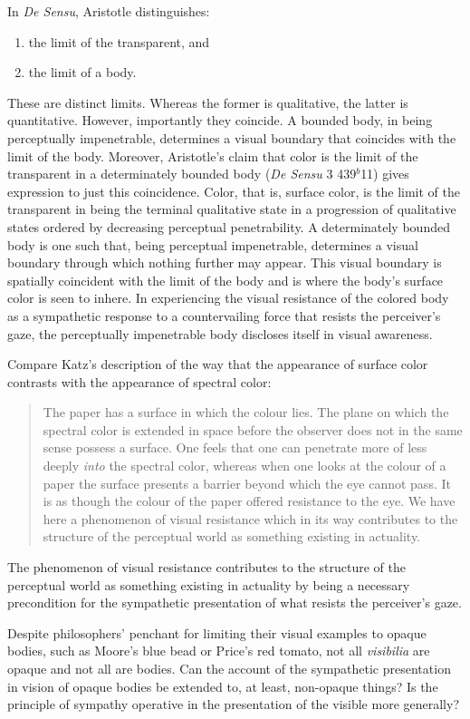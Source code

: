 In \emph{De Sensu}, Aristotle distinguishes:
\begin{enumerate}[(1)]
	\item the limit of the transparent, and
	\item the limit of a body.
\end{enumerate}
These are distinct limits. Whereas the former is qualitative, the latter is quantitative. However, importantly they coincide. A bounded body, in being perceptually impenetrable, determines a visual boundary that coincides with the limit of the body. Moreover, Aristotle’s claim that color is the limit of the transparent in a determinately bounded body (\emph{De Sensu} 3 439\( ^{b} \)11) gives expression to just this coincidence. Color, that is, surface color, is the limit of the transparent in being the terminal qualitative state in a progression of qualitative states ordered by decreasing perceptual penetrability. A determinately bounded body is one such that, being perceptual impenetrable, determines a visual boundary through which nothing further may appear. This visual boundary is spatially coincident with the limit of the body and is where the body’s surface color is seen to inhere. In experiencing the visual resistance of the colored body as a sympathetic response to a countervailing force that resists the perceiver's gaze, the perceptually impenetrable body discloses itself in visual awareness.

Compare Katz's description of the way that the appearance of surface color contrasts with the appearance of spectral color:
\begin{quote}
	The paper has a surface in which the colour lies. The plane on which the spectral color is extended in space before the observer does not in the same sense possess a surface. One feels that one can penetrate more of less deeply \emph{into} the spectral color, whereas when one looks at the colour of a paper the surface presents a barrier beyond which the eye cannot pass. It is as though the colour of the paper offered resistance to the eye. We have here a phenomenon of visual resistance which in its way contributes to the structure of the perceptual world as something existing in actuality. \citep[8]{Katz:1935qv}
\end{quote}
The phenomenon of visual resistance contributes to the structure of the perceptual world as something existing in actuality by being a necessary precondition for the sympathetic presentation of what resists the perceiver's gaze.

Despite philosophers' penchant for limiting their visual examples to opaque bodies, such as Moore's \citeyearpar{Moore:1903uo} blue bead or Price's \citeyearpar{Price:1932fk} red tomato, not all \emph{visibilia} are opaque and not all are bodies. Can the account of the sympathetic presentation in vision of opaque bodies be extended to, at least, non-opaque things? Is the principle of sympathy operative in the presentation of the visible more generally?

